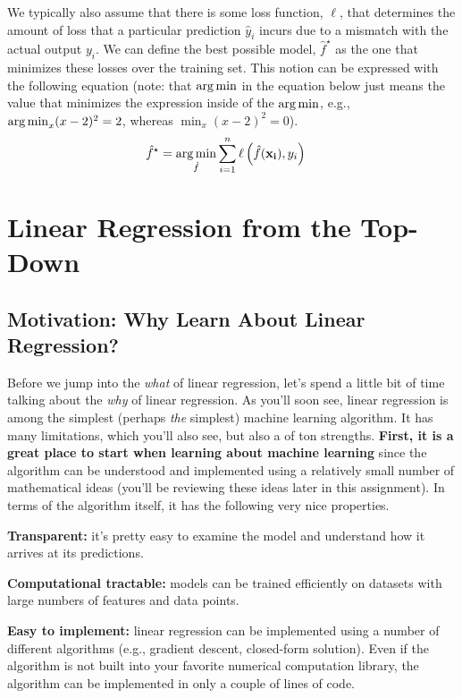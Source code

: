 \documentclass[assignment01_Solutions]{subfiles}
\begin{document}
We typically also assume that there is some loss function, $\ell$, that determines the amount of loss that a particular prediction $\hat{y}_i$ incurs due to a mismatch with the actual output $y_i$.  We can define the best possible model, $\hat{f}^\star$ as the one that minimizes these losses over the training set.  This notion can be expressed with the following equation  (note: that $\operatorname*{arg\,min}$ in the equation below just means the value that minimizes the expression inside of the $\operatorname*{arg\,min}$, e.g., $\operatorname*{arg\,min}_{x} (x - 2)^2 = 2$, whereas $\min_{x} (x-2)^2 = 0$).
\begin{align}
\hat{f}^\star &= \operatorname*{arg\,min}_{\hat{f}} \sum_{i=1}^n \ell \left ( \hat{f}(\mathbf{x_i}), y_i \right )
\end{align} 

\section{Linear Regression from the Top-Down}

\subsection*{Motivation: Why Learn About Linear Regression?}
Before we jump into the \emph{what} of linear regression, let's spend a little bit of time talking about the \emph{why} of linear regression.  As you'll soon see, linear regression is among the simplest (perhaps \emph{the} simplest) machine learning algorithm.  It has many limitations, which you'll also see, but also a of ton strengths.  \textbf{First, it is a great place to start when learning about machine learning} since the algorithm can be understood and implemented using a relatively small number of mathematical ideas (you'll be reviewing these ideas later in this assignment).  In terms of the algorithm itself, it has the following very nice properties.

\bi
\item \textbf{Transparent:} it's pretty easy to examine the model and understand how it arrives at its predictions.
\item \textbf{Computational tractable:} models can be trained efficiently on datasets with large numbers of features and data points.
\item \textbf{Easy to implement:} linear regression can be implemented using a number of different algorithms (e.g., gradient descent, closed-form solution).  Even if the algorithm is not built into your favorite numerical computation library, the algorithm can be implemented in only a couple of lines of code.
\ei
\end{document}
